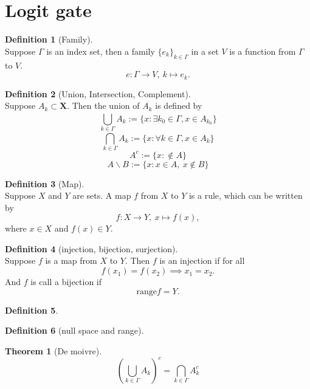 \documentclass[12pt]{book}
\theoremstyle{definition}
\newtheorem{definition}{Definition}[chapter]
\newtheorem{theorem}{Theorem}[chapter]
\newcommand{\X}{\mathbf{X}}
\newcommand{\Union}[2]{{\bigcup_{#1}^{#2}}}
\newcommand{\Intersection}[2]{{\bigcap_{#1}^{#2}}}
\begin{document}
\section{Logit gate}


\begin{definition}[Family] \ \\
Suppose $\Gamma$ is an index set, then a family $\{e_k\}_{k\in \Gamma}$ in a set $V$ is a function from $\Gamma$ to $V$.
$$
e : \Gamma \to V,\ k\mapsto e_k.
$$
\end{definition}

\begin{definition}[Union, Intersection, Complement] \ \\
 Suppose $A_k \subset \X$. Then the union of $A_k$ is defined by 
 $$
 \Union{k\in\Gamma}{} A_k := \{ x: \exists k_0 \in \Gamma, x\in A_{k_0}\}
 $$
 $$
 \Intersection{k\in\Gamma}{} A_k := \{ x: \forall k \in \Gamma, x\in A_{k}\}
 $$
 $$
 A^c := \{x: \notin A\}
 $$
 $$
 A \backslash B := \{x: x\in A,\ x \notin B \}
 $$
\end{definition}

\begin{definition}[Map] \ \\
Suppose $X$ and $Y$ are sets. A map $f$ from $X$ to $Y$ is a rule, which can be written by
$$
f: X \to Y,\ x \mapsto f(x),
$$
where $x \in X$ and $f(x) \in Y$.
\end{definition}

\begin{definition}[injection, bijection, surjection] \ \\
Suppose $f$ is a map from $X$ to $Y$. Then $f$ is an injection if for all 
$$
f(x_1) = f(x_2) \implies x_1=x_2.
$$
And $f$ is call a bijection if 
$$
\mathrm{range} f = Y.
$$
\end{definition}


\begin{definition}
	
\end{definition}





\begin{definition}[null space and range] \ \\
\end{definition}








\begin{theorem}[De moivre] \ \\
$$
(\Union{k\in\Gamma}{} A_k)^c =  \Intersection{k\in\Gamma}{} A_k^c
$$
\end{theorem}
\end{document}
